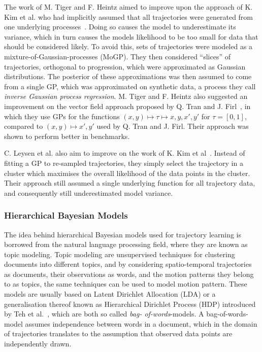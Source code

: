 The work of M. Tiger and F. Heintz aimed to improve upon the approach of K. Kim et
al. who had implicitly assumed that all trajectories were generated
from one underlying processes~\cite{Tiger2015Jul}. Doing so causes the model to
underestimate its variance, which in turn causes the models likelihood
to be too small for data that should be considered likely. To avoid this,
sets of trajectories were modeled as a
mixture-of-Gaussian-processes (MoGP). They then considered ``slices''
of trajectories, orthogonal to progression, which were approximated as
Gaussian distributions. The posterior of these approximations was
then assumed to come from a single GP, which was approximated on synthetic data, 
a process they call \textit{inverse Gaussian process regression}.
M. Tiger and F. Heintz also suggested an improvement on
the vector field approach proposed by Q. Tran and
J. Firl~\cite{Tiger2018Jun}, in which they use GPs for the functions
$(x, y) \mapsto \tau \mapsto x, y, x', y'$ for $\tau = [0, 1]$, compared to
$(x, y) \mapsto x', y'$ used by Q. Tran and J. Firl. Their approach
was shown to perform better in benchmarks.

C. Leysen et al. also aim to improve on the work of K. Kim et
al~\cite{Leysen2016Sep}. Instead of fitting a GP to re-sampled trajectories, 
they simply select the trajectory in a cluster which maximises the overall
likelihood of the data points in the cluster. Their approach still
assumed a single underlying function for all trajectory data,
and consequently still underestimated model variance.

\subsubsection{Hierarchical Bayesian Models}
The idea behind hierarchical Bayesian models used for trajectory
learning is borrowed from the natural language processing field, where
they are known as topic modeling. Topic modeling are unsupervised
techniques for clustering documents into different topics, and by 
considering spatio-temporal trajectories as documents,
their observations as words, and the motion patterns they belong to as
topics, the same techniques can be used to model motion pattern.  
These models are usually based on Latent Dirichlet Allocation (LDA) or
a generalisation thereof known as Hierarchical Dirichlet Process (HDP)
introduced by Teh et al.~\cite{teh2005sharing}, which are both so called \textit{bag-
of-words}-models. A bag-of-words-model assumes independence between
words in a document, which in the domain of trajectories translates to the
assumption that observed data points are independently drawn.

